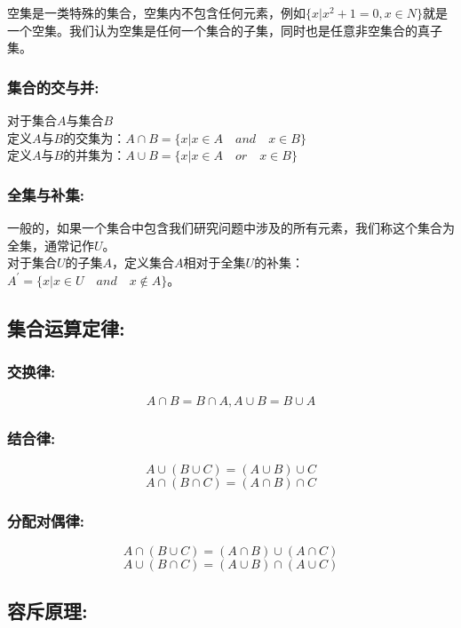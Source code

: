 \documentclass[UTF8]{article}
\begin{document}
空集是一类特殊的集合，空集内不包含任何元素，例如$\{x|x^2 + 1 = 0, x \in N \}$就是一个空集。我们认为空集是任何一个集合的子集，同时也是任意非空集合的真子集。

\subsubsection{集合的交与并:}

对于集合$A$与集合$B$\\

定义$A$与$B$的交集为：$A \cap B = \{x | x\in A \quad and \quad x\in B\}$\\
 
定义$A$与$B$的并集为：$A \cup B = \{x | x\in A \quad or \quad x\in B\}$

\subsubsection{全集与补集:}

一般的，如果一个集合中包含我们研究问题中涉及的所有元素，我们称这个集合为全集，通常记作$U$。\\

对于集合$U$的子集$A$，定义集合$A$相对于全集$U$的补集：$A^{'} = \{x|x\in U \quad and \quad x\notin A\}$。

\subsection{集合运算定律:}

\subsubsection{交换律:}
$$A \cap B = B \cap A, A\cup B = B\cup A$$

\subsubsection{结合律:}
$$A\cup(B\cup C) = (A\cup B)\cup C$$
$$A\cap(B\cap C) = (A\cap B)\cap C$$

\subsubsection{分配对偶律:}
$$A\cap(B\cup C) = (A\cap B) \cup (A\cap C)$$
$$A\cup(B\cap C) = (A\cup B) \cap (A\cup C)$$

\subsection{容斥原理:}
\end{document}
